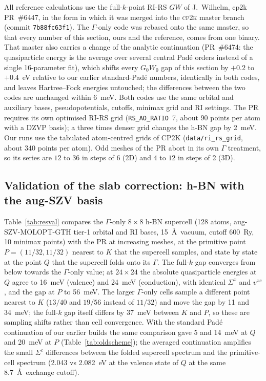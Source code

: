 \documentclass[%
 reprint,
superscriptaddress,
 amsmath,amssymb,
 aps,
prb,
]{revtex4-2}
\newcommand{\cpk}{\textsc{cp2k}}
\begin{document}
All reference calculations use the full-$k$-point RI-RS $GW$ of J.~Wilhelm, cp2k
PR~\#6447, in the form in which it was merged into the \cpk{} master branch (commit
\texttt{7b88fc63f1}). The $\Gamma$-only code was rebased onto the same master, so that every
number of this section, ours and the reference, comes from one binary. That master also
carries a change of the analytic continuation (PR~\#6474: the quasiparticle energy is the
average over several central Pad\'e orders instead of a single 16-parameter fit), which
shifts every $G_0W_0$ gap of this section by $+0.2$ to $+0.4$~eV relative to our earlier
standard-Pad\'e numbers, identically in both codes, and leaves Hartree--Fock energies
untouched; the differences between the two codes are unchanged within 6~meV. Both codes use
the same orbital and auxiliary bases, pseudopotentials, cutoffs, minimax grid and RI
settings. The PR requires its own optimised RI-RS grid
(\texttt{RS\_AO\_RATIO}~7, about 90 points per atom with a DZVP basis); a three times denser
grid changes the h-BN gap by 2~meV. Our runs use the tabulated atom-centred grids of CP2K
(\texttt{data/ri\_rs\_grid}, about 340 points per atom). Odd meshes of the PR abort in its own
$\Gamma$ treatment, so its series are $12$ to $36$ in steps of 6 (2D) and $4$ to $12$ in
steps of 2 (3D).

\subsection{Validation of the slab correction: h-BN with the aug-SZV basis}
\label{sec:resval}

Table~\ref{tab:resval} compares the $\Gamma$-only $8\times8$ h-BN supercell (128 atoms,
aug-SZV-MOLOPT-GTH tier-1 orbital and RI bases, 15~\AA\ vacuum, cutoff 600~Ry, 10 minimax
points) with the PR at increasing meshes, at the primitive point $P=(11/32,11/32)$ nearest to
$K$ that the supercell samples, and state by state at the point $Q$ that the supercell folds
onto its $\Gamma$. The full-$k$ gap converges from below towards the $\Gamma$-only value; at
$24\times24$ the absolute quasiparticle energies at $Q$ agree to 16~meV (valence) and 24~meV
(conduction), with identical $\Sigma^x$ and $v^{xc}$, and the gap at $P$ to 56~meV. The larger
$\Gamma$-only cells sample a different point nearest to $K$ ($13/40$ and $19/56$ instead of
$11/32$) and move the gap by 11 and 34~meV; the full-$k$ gap itself differs by 37~meV between
$K$ and $P$, so these are sampling shifts rather than cell convergence. With the standard
Pad\'e continuation of our earlier builds the same comparison gave 5 and 14~meV at $Q$ and
20~meV at $P$ (Table~\ref{tab:oldscheme}); the averaged continuation amplifies the small
$\Sigma^c$ differences between the folded supercell spectrum and the primitive-cell spectrum
(2.043 vs 2.082~eV at the valence state of $Q$ at the same 8.7~\AA\ exchange cutoff).
\end{document}
